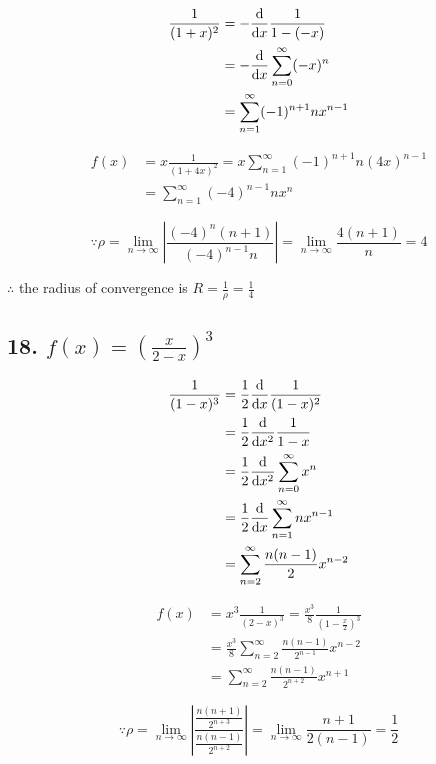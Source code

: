 \documentclass{article}
\begin{document}
    $$\begin{aligned}
        \frac{1}{(1+x)^2} &= -\frac{\textrm d}{\textrm dx}\frac{1}{1- (-x)} \\
        &= -\frac{\textrm d}{\textrm dx}\sum_{n=0}^\infty (-x)^n \\
        &= \sum_{n=1}^\infty (-1)^{n+1}nx^{n-1}
    \end{aligned}$$

    $$\begin{aligned}
        f(x) &= x\frac{1}{(1+4x)^2} = x \sum_{n=1}^\infty (-1)^{n+1} n (4x)^{n-1} \\
        &= \sum_{n=1}^\infty (-4)^{n-1} nx^n
    \end{aligned}$$

    $$\because \rho = \lim_{n\to\infty}|\frac{(-4)^{n}(n+1)}{(-4)^{n-1} n}| = \lim_{n\to\infty}\frac{4(n+1)}{n} = 4$$

    $\therefore$ the radius of convergence is $R = \frac 1 \rho = \frac 1 4$

    \subsection*{18. $f(x) = (\frac{x}{2-x})^3$}

    $$\begin{aligned}
        \frac{1}{(1-x)^3} &= \frac 1 2\frac{\textrm d}{\textrm dx}\frac{1}{(1-x)^2} \\
        &= \frac 1 2 \frac{\textrm d}{\textrm dx^2} \frac{1}{1-x} \\
        &= \frac 1 2 \frac{\textrm d}{\textrm dx^2} \sum_{n=0}^\infty x^n \\
        &= \frac 1 2 \frac{\textrm d}{\textrm dx} \sum_{n=1}^\infty nx^{n-1} \\
        &= \sum_{n=2}^\infty \frac{n(n-1)}{2} x^{n-2}
    \end{aligned}$$

    $$\begin{aligned}
        f(x) &= x^3 \frac{1}{(2 - x)^3} = \frac{x^3}{8} \frac{1}{(1 - \frac x 2)^3} \\
        &= \frac{x^3}{8} \sum_{n=2}^\infty \frac{n(n-1)}{2^{n-1}} x^{n-2} \\
        &= \sum_{n=2}^\infty \frac{n(n-1)}{2^{n+2}}x^{n+1}
    \end{aligned}$$

    $$\because \rho = \lim_{n\to\infty}| \frac{\frac{n(n+1)}{2^{n+3}}}{\frac{n(n-1)}{2^{n+2}}} | = \lim_{n\to\infty}\frac{n+1}{2(n-1)} = \frac 1 2$$
\end{document}
